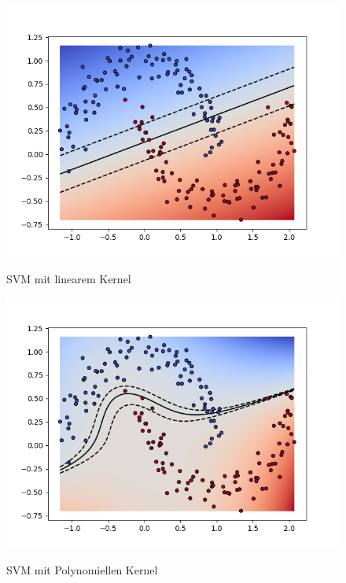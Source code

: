 \documentclass[10pt,a4paper]{scrartcl}
\begin{document}
                \begin{figure}[ht] 
                    \label{kernels} 
                    \begin{minipage}[b]{0.5\linewidth}
                        \centering
                        \includegraphics[width=.8\textwidth]{img_kernel/kernelLin.png}
                        \caption{SVM mit linearem Kernel} 
                        \vspace{4ex}
                        \label{ker:lin}
                    \end{minipage}%
                    \begin{minipage}[b]{0.5\linewidth}
                        \centering
                        \includegraphics[width=.8\textwidth]{img_kernel/kernelPol.png}
                        \caption{SVM mit Polynomiellen Kernel} 
                        \vspace{4ex}
                        \label{ker:pol}
                    \end{minipage} 
                    \begin{minipage}[b]{0.5\linewidth}

\end{minipage}
\end{figure}
\end{document}
